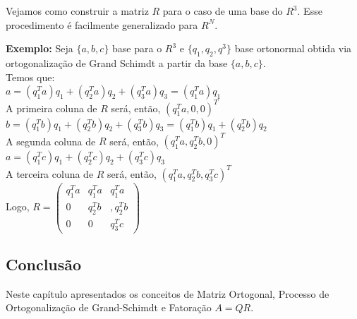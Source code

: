 \documentclass[12pt]{article}
\begin{document}
Vejamos como construir a matriz $R$ para o caso de uma base do $R^3$. Esse procedimento é facilmente generalizado para $R^N$.

\textbf{Exemplo:} Seja $\{a,b,c\}$ base para o $R^3$ e $\{q_1,q_2,q^3\}$ base ortonormal obtida via ortogonalização de Grand Schimdt a partir da base $\{a,b,c\}$.\\

Temos que:\\

$a=(q_1^Ta)q_1+(q_2^Ta)q_2+(q_3^Ta)q_3=(q_1^Ta)q_1$\\

A primeira coluna de $R$ será, então, $(q_1^{T}a,0,0)^T$\\

$b=(q_1^Tb)q_1+(q_2^Tb)q_2+(q_3^Tb)q_3=(q_1^Tb)q_1+(q_2^Tb)q_2$\\

A segunda coluna de $R$ será, então, $(q_1^{T}a,q_2^Tb,0)^T$\\

$a=(q_1^Tc)q_1+(q_2^Tc)q_2+(q_3^Tc)q_3$\\

A terceira coluna de $R$ será, então, $(q_1^{T}a,q_2^Tb,q_3^Tc)^T$\\

Logo, $R=\begin{pmatrix}
	q_1^{T}a & q_1^{T}a & q_1^{T}a\\
	0 &  q_2^Tb& ,q_2^Tb\\ 
	0 & 0 & q_3^Tc
\end{pmatrix}$

\subsection{Conclusão}
Neste capítulo apresentados os conceitos de Matriz Ortogonal, Processo de Ortogonalização de Grand-Schimdt e Fatoração $A=QR$.
\end{document}
